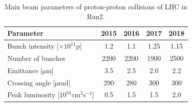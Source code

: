 \begin{table}[!h]
	\begin{adjustbox}{max width=1.\textwidth,center}
		\begin{tabular}{lcccc}
			\hline 
			\textbf{Parameter}              											&  \textbf{2015} & \textbf{2016} 			& \textbf{2017} & \textbf{2018} \\ 
			\hline 
				Bunch intensity [$\mathrm{\times10^{11}p}$] 		  &  1.2 				  & 1.1 						  & 1.25 				& 1.15 				\\
				Number of bunches   												 &  2200 			   & 2200						 & 1900				  & 2500			\\
				Emittance [$\mathrm{\mu m}$] 							 	  & 3.5					  & 2.5 						  &2.0 					 & 2.2				 \\
				Crossing angle [$\mathrm{\mu rad}$] 					   & 290 				  & 280 						 & 300 				   & 300		      \\
				Peak luminosity [$\mathrm{10^{34} cm^{2}s^{-1}}$] 	& 0.5 					& 1.5 							& 1.5				   &  2.0				\\
			\hline  
		\end{tabular} 
	\end{adjustbox}
	\caption{Main beam parameters of proton-proton collisions of LHC in Run2.}
	\label{tab:lum}
\end{table} 
\clearpage

